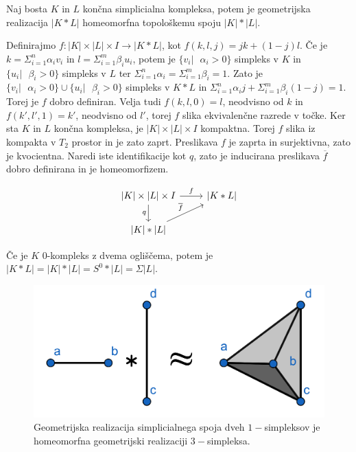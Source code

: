 \documentclass[mat1]{fmfdelo}
\begin{document}
\begin{trditev}
    Naj bosta $K$ in $L$ končna simplicialna kompleksa, potem je geometrijska realizacija $|K\ast L|$ homeomorfna topološkemu spoju $|K|\ast |L|$.
    \label{tr:spoj}
\end{trditev}

\begin{dokaz}
    Definirajmo $f\colon |K|\times |L|\times I\rightarrow |K\ast L|$, kot $f(k,l,j)=jk+(1-j)l$. Če je $k=\Sigma_{i=1}^n \alpha_i v_i$ in $l=\Sigma_{i=1}^m \beta_i u_i$, potem je $\{v_i|\text{ $\alpha_i > 0$}\}$ simpleks v $K$ in $\{u_i|\text{ $\beta_i > 0$}\}$ simpleks v $L$ ter $\Sigma_{i=1}^n \alpha_i = \Sigma_{i=1}^m \beta_i=1$. Zato je $\{v_i|\text{ $\alpha_i > 0$}\}\cup \{u_i|\text{ $\beta_i > 0$}\}$ simpleks v $K\ast L$  in $\Sigma_{i=1}^n \alpha_i j + \Sigma_{i=1}^m \beta_i (1-j)=1$. Torej je $f$ dobro definiran. Velja tudi $f(k,l,0)=l$, neodvisno od $k$ in $f(k',l',1)=k'$, neodvisno od $l'$, torej $f$ slika ekvivalenčne razrede v točke. Ker sta $K$ in $L$ končna kompleksa, je $|K|\times |L|\times I$ kompaktna. Torej $f$ slika iz kompakta v $T_2$ prostor in je zato zaprt. Preslikava $f$ je zaprta in surjektivna, zato je kvocientna. Naredi iste identifikacije kot $q$, zato je inducirana preslikava $\overline{f}$ dobro definirana in je homeomorfizem.
    
\[\begin{tikzcd}
    {|K|\times |L|\times I }\arrow{r}{f} \arrow[swap]{d}{q} & {|K\ast L|} \\
    {|K|\ast |L|} \arrow{ru}{\overline{f}}
   \end{tikzcd}
    \]


\end{dokaz}

Če je $K$ 0-kompleks z dvema ogliščema, potem je $|K\ast L|=|K|\ast |L|=S^0\ast |L| = \Sigma |L|$.

\begin{figure}[h]
    \centering
    \includegraphics[width=0.6\linewidth]{spoj.png}
    \caption{Geometrijska realizacija simplicialnega spoja dveh $1-$simpleksov je homeomorfna geometrijski realizaciji $3-$simpleksa.}
\end{figure}
\end{document}
